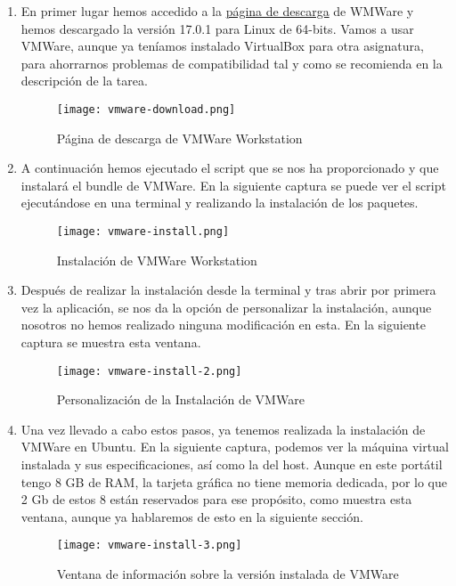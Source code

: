 \begin{enumerate}
    \item En primer lugar hemos accedido a la \href{https://customerconnect.vmware.com/en/downloads/details?downloadGroup=WKST-PLAYER-1701&productId=1377&rPId=100675}{página de descarga} de WMWare y hemos descargado la versión 17.0.1 para Linux de 64-bits. Vamos a usar VMWare, aunque ya teníamos instalado VirtualBox para otra asignatura, para ahorrarnos problemas de compatibilidad tal y como se recomienda en la descripción de la tarea.

    \begin{figure}[H]
        \centering
        \texttt{[image: vmware-download.png]}
        \caption{Página de descarga de VMWare Workstation}
    \end{figure}

    \item A continuación hemos ejecutado el script que se nos ha proporcionado y que instalará el bundle de VMWare. En la siguiente captura se puede ver el script ejecutándose en una terminal y realizando la instalación de los paquetes.

    \begin{figure}[ht]
        \centering
        \texttt{[image: vmware-install.png]}
        \caption{Instalación de VMWare Workstation}
    \end{figure}

    \item Después de realizar la instalación desde la terminal y tras abrir por primera vez la aplicación, se nos da la opción de personalizar la instalación, aunque nosotros no hemos realizado ninguna modificación en esta. En la siguiente captura se muestra esta ventana.

    \begin{figure}[ht]
        \centering
        \texttt{[image: vmware-install-2.png]}
        \caption{Personalización de la Instalación de VMWare}
    \end{figure}

    \item Una vez llevado a cabo estos pasos, ya tenemos realizada la instalación de VMWare en Ubuntu. En la siguiente captura, podemos ver la máquina virtual instalada y sus especificaciones, así como la del host. Aunque en este portátil tengo 8 GB de RAM, la tarjeta gráfica no tiene memoria dedicada, por lo que 2 Gb de estos 8 están reservados para ese propósito, como muestra esta ventana, aunque ya hablaremos de esto en la siguiente sección.

    \begin{figure}[ht]
        \centering
        \texttt{[image: vmware-install-3.png]}
        \caption{Ventana de información sobre la versión instalada de VMWare}
    \end{figure}
\end{enumerate}

